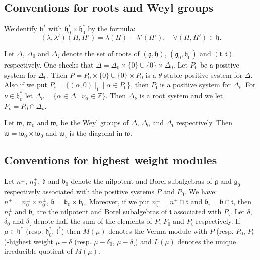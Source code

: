 \setcounter{section}{6}
\setcounter{subsection}{0}
\subsection{Conventions for roots and Weyl groups}\label{chap6:subsec6.1}

We\pageoriginale identify $\mathfrak{h}^*$ with $\mathfrak{h}^*_0 \times
\mathfrak{h}^*_0$ by the formula:
$$
(\lambda, \lambda') (H, H') = \lambda(H) + \lambda'(H'), \quad \forall
(H, H') \in \mathfrak{h}.
$$

Let $\Delta$, $\Delta_0$ and $\Delta_\mathfrak{t}$ denote the set of
roots of $(\mathfrak{g}, \mathfrak{h})$, $(\mathfrak{g}_0,
\mathfrak{h}_0)$ and $(\mathfrak{t}, \mathfrak{t})$ respectively. One
checks that $\Delta = \Delta_0 \times \{0\} \cup \{0\} \times
\Delta_0$. Let $P_0$ be a positive system for $\Delta_0$. Then $P=P_0
\times \{0\} \cup \{0\} \times P_0$ is a $\theta$-stable positive
system for $\Delta$. Also if we put $P_\mathfrak{t} = \{(\alpha, 0)
\mid_\mathfrak{t} \mid \alpha \in P_0\}$, then $P_\mathfrak{t}$ is a
positive system for $\Delta_\mathfrak{t}$. For $\nu \in
\mathfrak{h}^*_0$ let $\Delta_\nu = \{\alpha \in \Delta \mid
\nu_\alpha \in \mathbb{Z} \}$. Then $\Delta_\nu$ is a root system and
we let $P_\nu = P_0 \cap \Delta_\nu$. 


Let $\mathfrak{w}$, $\mathfrak{w}_0$ and $\mathfrak{w}_\mathfrak{t}$
be the Weyl groups of $\Delta$, $\Delta_0$ and $\Delta_\mathfrak{t}$
respectively. Then $\mathfrak{w} = \mathfrak{w}_0 \times
\mathfrak{w}_0$ and $\mathfrak{w}_\mathfrak{t}$ is the diagonal in
$\mathfrak{w}$.

\subsection{Conventions for highest weight
  modules}\label{chap6:subsec6.2}
Let $n^{\pm}$, $n^\pm_0$, $\mathfrak{b}$ and $\mathfrak{b}_0$ denote
the nilpotent and Borel subalgebras of $\mathfrak{g}$ and
$\mathfrak{g}_0$ respectively associated with the positive systems $P$
and $P_0$. We have: $n^{\pm} = n^{\pm}_0 \times n^\pm_0$,
$\mathfrak{b} = \mathfrak{b}_0 \times \mathfrak{b}_0$. Moreover, if we
put $n^\pm_\mathfrak{t} = n^\pm \cap \mathfrak{t}$ and
$\mathfrak{b}_\mathfrak{t} = \mathfrak{b} \cap \mathfrak{t}$, then
$n^\pm_\mathfrak{t}$ and $\mathfrak{b}_\mathfrak{t}$ are the nilpotent
and Borel subalgebras of $\mathfrak{t}$ associated with
$P_\mathfrak{t}$. Let $\delta$, $\delta_0$ and
$\mathfrak{\delta}_\mathfrak{t}$ denote half the sum of the elements
of $P$, $P_0$ and $P_\mathfrak{t}$ respectively. If $\mu \in
\mathfrak{h}^*$ (resp. $\mathfrak{h}^*_0$, $\mathfrak{t}^*$) then
$M(\mu)$ denotes the Verma module with $P$ (resp. $P_0$,
$P_\mathfrak{t}$)-highest weight $\mu-\delta$ (resp. $\mu-\delta_0$,
$\mu - \delta_\mathfrak{t}$) and $L(\mu)$ denotes the unique
irreducible quotient of $M(\mu)$. 


